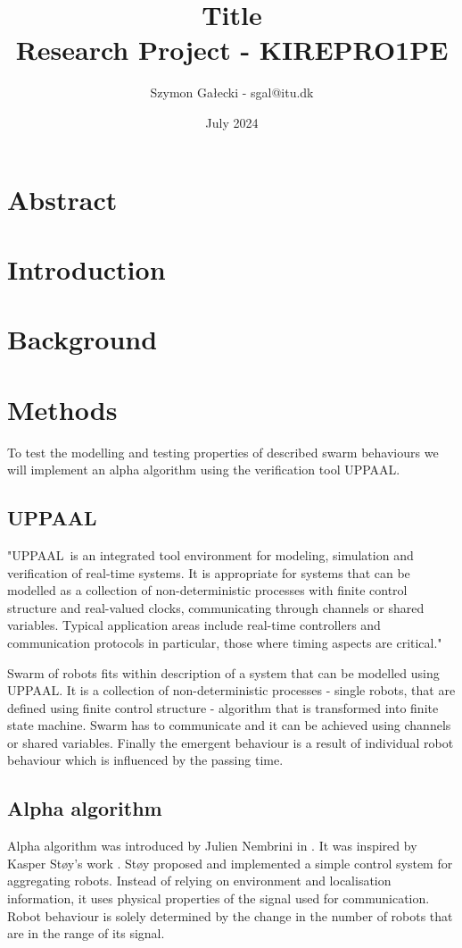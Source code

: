\documentclass{article}
\title{Title\\Research Project - KIREPRO1PE }
\author{Szymon Gałecki - sgal@itu.dk}
\date{July 2024}
\begin{document}
\maketitle
\newpage

\tableofcontents
\newpage

\section{Abstract}
\section{Introduction}
\section{Background}
\section{Methods}
To test the modelling and testing properties of described swarm behaviours we will implement an alpha algorithm using the verification tool UPPAAL. 
\subsection{UPPAAL}
"UPPAAL is an integrated tool environment for modeling, simulation and verification of real-time systems. It is appropriate for systems that can be modelled as a collection of non-deterministic processes with finite control structure and real-valued clocks, communicating through channels or shared variables. Typical application areas include real-time controllers and communication protocols in particular, those where timing aspects are critical." \cite{UPPAAL_in_a_Nutshell}

Swarm of robots fits within description of a system that can be modelled using UPPAAL. It is a collection of non-deterministic processes - single robots, that are defined using finite control structure - algorithm that is transformed into finite state machine. Swarm has to communicate and it can be achieved using channels or shared variables. Finally the emergent behaviour is a result of individual robot behaviour which is influenced by the passing time.

\subsection{Alpha algorithm}
Alpha algorithm was introduced by Julien Nembrini in \cite{Minimalist_Coherent_Swarming_of_Wireless_Networked_Autonomous_Mobile_Robots}. It was inspired by Kasper Støy's work \cite{Using_Situated_Communication_in_Distributed_Autonomous_Mobile_Robotics}. Støy proposed and implemented a simple control system for aggregating robots. Instead of relying on environment and localisation information, it uses physical properties of the signal used for communication. Robot behaviour is solely determined by the change in the number of robots that are in the range of its signal.
\end{document}
